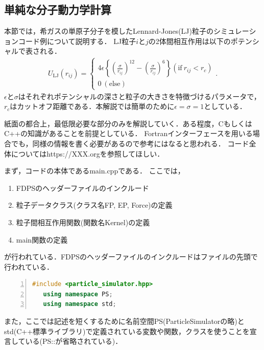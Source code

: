 \documentclass{jspf}            %
\begin{document}
\subsection{単純な分子動力学計算}
本節では，希ガスの単原子分子を模したLennard-Jones(LJ)粒子のシミュレーションコード例について説明する．
LJ粒子$i$と$j$の2体間相互作用は以下のポテンシャルで表される．
\begin{eqnarray}
 U_{\mathrm{LJ}}(r_{ij}) = \begin{cases}
	   4\epsilon\left\{\left(\frac{\sigma}{r_{ij}}\right)^{12} - \left(\frac{\sigma}{r_{ij}}\right)^{6}\right\} (\mathrm{if}\ r_{ij} < r_c)\\
	   0\ (\mathrm{else})
	  \end{cases}.
\end{eqnarray}
$\epsilon$と$\sigma$はそれぞれポテンシャルの深さと粒子の大きさを特徴づけるパラメータで，$r_c$はカットオフ距離である．本解説では簡単のために$\epsilon = \sigma = 1$としている．

紙面の都合上，最低限必要な部分のみを解説していく．ある程度，CもしくはC++の知識があることを前提としている．
Fortranインターフェースを用いる場合でも，同様の情報を書く必要があるので参考にはなると思われる．
コード全体についてはhttps://XXX.orgを参照してほしい．

まず，コードの本体であるmain.cppである．
ここでは，
 \begin{enumerate}
 \item FDPSのヘッダーファイルのインクルード
 \item 粒子データクラス(クラス名FP, EP, Force)の定義
 \item 粒子間相互作用関数(関数名Kernel)の定義
 \item main関数の定義
 \end{enumerate}
 が行われている．FDPSのヘッダーファイルのインクルードはファイルの先頭で行われている．
  \begin{lstlisting}[language=c++,numbers=left,numbersep=5pt,frame=single,basicstyle=\footnotesize]
   #include <particle_simulator.hpp>
   using namespace PS;
   using namespace std;
  \end{lstlisting}
  また，ここでは記述を短くするために名前空間PS(ParticleSimulatorの略)とstd(C++標準ライブラリ)で定義されている変数や関数，クラスを使うことを宣言している(PS::が省略されている)．
\end{document}
